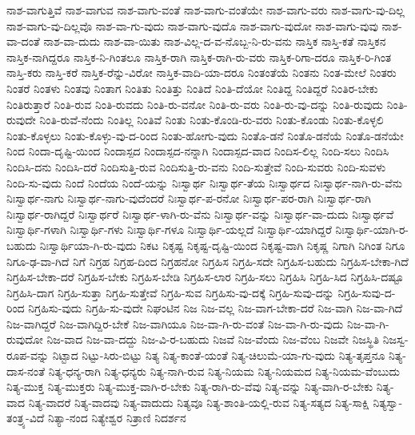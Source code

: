 {ನಾಶ-ವಾಗುತ್ತಿವೆ
ನಾಶ-ವಾಗುವ
ನಾಶ-ವಾಗು-ವಂತೆ
ನಾಶ-ವಾಗು-ವಂತೆಯೇ
ನಾಶ-ವಾಗು-ವರು
ನಾಶ-ವಾಗು-ವು-ದಿಲ್ಲ
ನಾಶ-ವಾಗು-ವು-ದಿಲ್ಲವೊ
ನಾಶ-ವಾ-ಗು-ವುದು
ನಾಶ-ವಾಗು-ವುದೊ
ನಾಶ-ವಾಗು-ವುದೋ
ನಾಶ-ವಾಗು-ವುವು
ನಾಶ-ವಾ-ದಂತೆ
ನಾಶ-ವಾ-ದುದು
ನಾಶ-ವಾ-ಯಿತು
ನಾಶ-ವಿಲ್ಲ-ದ-ವ-ನೊಬ್ಬ-ನಿ-ರು-ವನು
ನಾಸ್ತಿಕ
ನಾಸ್ತಿ-ಕತೆ
ನಾಸ್ತಿಕನ
ನಾಸ್ತಿಕ-ನಾಗಿದ್ದರೂ
ನಾಸ್ತಿಕ-ನಿ-ಗಿಂತಲೂ
ನಾಸ್ತಿಕ-ರಾಗಿ
ನಾಸ್ತಿಕ-ರಾಗಿ-ರು-ವರು
ನಾಸ್ತಿಕ-ರಿಗಾ-ದರೂ
ನಾಸ್ತಿಕ-ರಿ-ಗಿಂತ
ನಾಸ್ತಿ-ಕರು
ನಾಸ್ತಿ-ಕರೆ
ನಾಸ್ತಿಕ-ರೆನ್ನು-ವಿರೋ
ನಾಸ್ತಿಕ-ವಾದಿ-ಯಾ-ದರೂ
ನಿಂತಂತೆಯೆ
ನಿಂತನು
ನಿಂತ-ಮೇಲೆ
ನಿಂತರು
ನಿಂತರೆ
ನಿಂತಳು
ನಿಂತವು
ನಿಂತಾಗ
ನಿಂತಿತು
ನಿಂತಿತ್ತು
ನಿಂತಿದೆ
ನಿಂತಿ-ದೆಯೋ
ನಿಂತಿದ್ದ
ನಿಂತಿದ್ದರೆ
ನಿಂತಿರ-ಬೇಕು
ನಿಂತಿರುತ್ತಾರೆ
ನಿಂತಿ-ರುವ
ನಿಂತಿ-ರುವದು
ನಿಂತಿ-ರು-ವನೋ
ನಿಂತಿ-ರು-ವರು
ನಿಂತಿ-ರು-ವು-ದನ್ನು
ನಿಂತಿ-ರುವುದು
ನಿಂತಿ-ರುವುದೇ
ನಿಂತಿ-ರುವೆ-ನೆಂದು
ನಿಂತಿಲ್ಲ
ನಿಂತಿವೆ
ನಿಂತು
ನಿಂತು-ಕೊಂಡಿ-ರು-ವರು
ನಿಂತು-ಕೊಂಡು
ನಿಂತು-ಕೊಳ್ಳಲಿ
ನಿಂತು-ಕೊಳ್ಳಲು
ನಿಂತು-ಕೊಳ್ಳು-ವು-ದ-ರಿಂದ
ನಿಂತು-ಹೋಗು-ವುದು
ನಿಂತೊ-ಡನೆ
ನಿಂತೊ-ಡನೆಯೆ
ನಿಂತೊ-ಡನೆಯೇ
ನಿಂದ
ನಿಂದಾ-ದೃಷ್ಟಿ-ಯಿಂದ
ನಿಂದಾಸ್ಪದ
ನಿಂದಾಸ್ಪದ-ನನ್ನಾಗಿ
ನಿಂದಾಸ್ಪದ-ವಾದ
ನಿಂದಿಸ-ಲಿಲ್ಲ
ನಿಂದಿ-ಸಲು
ನಿಂದಿಸಿ
ನಿಂದಿಸಿ-ದನು
ನಿಂದಿಸಿ-ದರೆ
ನಿಂದಿಸುತ್ತಿ-ರುವ
ನಿಂದಿಸುತ್ತಿ-ರು-ವನು
ನಿಂದಿ-ಸುತ್ತೇವೆ
ನಿಂದಿ-ಸುವರು
ನಿಂದಿ-ಸುವಳು
ನಿಂದಿ-ಸು-ವುದು
ನಿಂದೆ
ನಿಂದೆಯ
ನಿಂದೆ-ಯನ್ನು
ನಿಃಸ್ವಾರ್ಥ
ನಿಃಸ್ವಾರ್ಥ-ತೆಯ
ನಿಃಸ್ವಾರ್ಥದ
ನಿಃಸ್ವಾರ್ಥ-ನಾಗಿ-ರು-ವೆನು
ನಿಃಸ್ವಾರ್ಥ-ನಾಗು
ನಿಃಸ್ವಾರ್ಥ-ನಾಗು-ವುದೆಂದರೆ
ನಿಃಸ್ವಾರ್ಥ-ಪ-ರನೋ
ನಿಃಸ್ವಾರ್ಥ-ಪರ-ರಾಗಿ
ನಿಃಸ್ವಾರ್ಥ-ರಾಗಿ
ನಿಃಸ್ವಾರ್ಥ-ರಾಗಿದ್ದರೆ
ನಿಃಸ್ವಾರ್ಥರೆ
ನಿಃಸ್ವಾರ್ಥ-ಳಾಗಿ-ರು-ವೆನು
ನಿಃಸ್ವಾರ್ಥ-ವನ್ನು
ನಿಃಸ್ವಾರ್ಥ-ವಾ-ದುದು
ನಿಃಸ್ವಾರ್ಥವೆ
ನಿಃಸ್ವಾರ್ಥಿ-ಗಳಾಗಿ
ನಿಃಸ್ವಾರ್ಥಿ-ಗಳು
ನಿಃಸ್ವಾರ್ಥಿ-ಗಳೂ
ನಿಃಸ್ವಾರ್ಥಿ-ಯಲ್ಲದೆ
ನಿಃಸ್ವಾರ್ಥಿ-ಯಾಗಿದ್ದರೆ
ನಿಃಸ್ವಾರ್ಥಿ-ಯಾಗಿ-ರ-ಬಹುದು
ನಿಃಸ್ವಾರ್ಥಿಯಾ-ಗಿ-ರು-ವುದು
ನಿಕಟ
ನಿಕೃಷ್ಟ
ನಿಕೃಷ್ಟ-ದೃಷ್ಟಿ-ಯಿಂದ
ನಿಕೃಷ್ಟ-ವಾಗಿ
ನಿಕೃಷ್ಣ
ನಿಗಾಗಿ
ನಿಗಿಂತ
ನಿಗೂ
ನಿಗೂ-ಢ-ವಾ-ಗಿದೆ
ನಿಗೆ
ನಿಗ್ರಹ
ನಿಗ್ರಹ-ದಿಂದ
ನಿಗ್ರಹನೋ
ನಿಗ್ರಹಿಸ
ನಿಗ್ರಹಿ-ಸದೇ
ನಿಗ್ರಹಿಸ-ಬಹುದು
ನಿಗ್ರಹಿಸ-ಬೇಕಾ-ಗಿದೆ
ನಿಗ್ರಹಿಸ-ಬೇಕಾ-ದರೆ
ನಿಗ್ರಹಿಸ-ಬೇಕು
ನಿಗ್ರಹಿಸ-ಬೇಡಿ
ನಿಗ್ರಹಿಸ-ಲಾರ
ನಿಗ್ರಹಿ-ಸಲು
ನಿಗ್ರಹಿಸಿ
ನಿಗ್ರಹಿ-ಸಿದ
ನಿಗ್ರಹಿಸಿ-ದಷ್ಟೂ
ನಿಗ್ರಹಿಸಿ-ದಾಗ
ನಿಗ್ರಹಿ-ಸುತ್ತಾ
ನಿಗ್ರಹಿ-ಸುತ್ತೇವೆ
ನಿಗ್ರಹಿ-ಸುವ
ನಿಗ್ರಹಿಸು-ವು-ದಕ್ಕೆ
ನಿಗ್ರಹಿ-ಸುವು-ದನ್ನು
ನಿಗ್ರಹಿ-ಸುವು-ದ-ರಿಂದ
ನಿಗ್ರಹಿಸು-ವುದು
ನಿಗ್ರಹಿ-ಸು-ವುದೇ
ನಿಘಂಟಿನ
ನಿಜ
ನಿಜ-ವಲ್ಲ
ನಿಜ-ವಾಗ-ಬೇಕಾ-ದರೆ
ನಿಜ-ವಾಗಿ
ನಿಜ-ವಾ-ಗಿದೆ
ನಿಜ-ವಾಗಿದ್ದರೆ
ನಿಜ-ವಾಗಿದ್ದಿರ-ಬೇಕೆ
ನಿಜ-ವಾಗಿಯೂ
ನಿಜ-ವಾ-ಗಿ-ರು-ವಂತೆ
ನಿಜ-ವಾ-ಗಿ-ರು-ವುದು
ನಿಜ-ವಾ-ಗಿ-ರುವುದೋ
ನಿಜ-ವಾದ
ನಿಜ-ವಾ-ದದ್ದು
ನಿಜ-ವಿ-ರ-ಬಹುದು
ನಿಜವೆ
ನಿಜ-ವೆಂದು
ನಿಜ-ವೆಂಬ
ನಿಜವೇ
ನಿಜಸ್ಥಿತಿ
ನಿಜಸ್ವ-ರೂಪ-ವನ್ನು
ನಿಟ್ಟಾದ
ನಿಟ್ಟು-ಸಿರು-ಬಿಟ್ಟು
ನಿತ್ಯ
ನಿತ್ಯ-ಕಾಂತೆ-ಯಂತೆ
ನಿತ್ಯ-ಚಿಲುಮೆ-ಯಾ-ಗು-ವುದು
ನಿತ್ಯ-ತೃಪ್ತನೂ
ನಿತ್ಯ-ದಾಸ-ನಂತೆ
ನಿತ್ಯ-ಧನ್ಯ-ರಾಗಿ
ನಿತ್ಯ-ಧನ್ಯರು
ನಿತ್ಯ-ನಾಗಿ-ರುವ
ನಿತ್ಯ-ನಿಯಮ
ನಿತ್ಯ-ನಿಯಮದ
ನಿತ್ಯ-ನಿಯಮ-ವೆಂಬುದು
ನಿತ್ಯ-ಮುಕ್ತ
ನಿತ್ಯ-ಮುಕ್ತರು
ನಿತ್ಯ-ಮುಕ್ತ-ವಾಗಿ-ರ-ಬೇಕು
ನಿತ್ಯ-ರಾಗಿ-ರು-ವೆವು
ನಿತ್ಯ-ವನ್ನು
ನಿತ್ಯ-ವಾಗಿ-ರ-ಬೇಕು
ನಿತ್ಯ-ವಾದ
ನಿತ್ಯ-ವಾದರೆ
ನಿತ್ಯ-ವಾದವು
ನಿತ್ಯ-ವಾದುದು
ನಿತ್ಯವೂ
ನಿತ್ಯ-ಶಾಂತಿ-ಯಲ್ಲಿ-ರುವ
ನಿತ್ಯ-ಸತ್ಯದ
ನಿತ್ಯ-ಸಾಕ್ಷಿ
ನಿತ್ಯಸ್ವಾ-ತಂತ್ರ್ಯ-ವಿದೆ
ನಿತ್ಯಾ-ನಂದ
ನಿತ್ಯೇಶ್ವರ
ನಿತ್ರಾಣಿ
ನಿದರ್ಶನ
}
